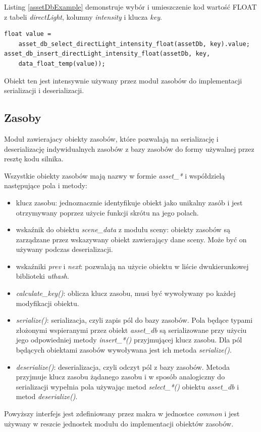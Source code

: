 Listing \ref{assetDbExample} demonstruje wybór i umieszczenie kod wartość FLOAT z tabeli \textit{directLight}, kolumny \textit{intensity} i klucza \textit{key}.
\lstset{language=C}
\begin{lstlisting}[caption={Deserializacja i serializacja wartości zmiennoprzecinkowej},captionpos=b,label={assetDbExample}]
float value =
	asset_db_select_directLight_intensity_float(assetDb, key).value;
asset_db_insert_directLight_intensity_float(assetDb, key,
	data_float_temp(value));
\end{lstlisting}

Obiekt ten jest intensywnie używany przez moduł zasobów do implementacji serializacji i deserializacji.

\subsection{Zasoby}

Moduł zawierajacy obiekty zasobów, które pozwalają na serializację i deserializację indywidualnych zasobów z bazy zasobów do formy używalnej przez resztę kodu silnika.

Wszystkie obiekty zasobów mają nazwy w formie \textit{asset\_*} i współdzielą następujące pola i metody:
\begin{itemize}
	\item klucz zasobu: jednoznacznie identyfikuje obiekt jako unikalny zasób i jest otrzymywany poprzez użycie funkcji skrótu na jego polach.
	\item wskaźnik do obiektu \textit{scene\_data} z modułu sceny: obiekty zasobów są zarządzane przez wskazywany obiekt zawierający dane sceny. Może być on używany podczas deserializacji.
	\item wskaźniki \textit{prev} i \textit{next}: pozwalają na użycie obiektu w liście dwukierunkowej biblioteki \textit{uthash}.
	\item \textit{calculate\_key()}: oblicza klucz zasobu, musi być wywoływany po każdej modyfikacji obiektu.
	\item \textit{serialize()}: serializacja, czyli zapis pól do bazy zasobów.
	Pola będące typami złożonymi wspieranymi przez obiekt \textit{asset\_db} są serializowane przy użyciu jego odpowiedniej metody \textit{insert\_*()} przyjmującej klucz zasobu.
	Dla pól będących obiektami zasobów wywoływana jest ich metoda \textit{serialize()}.
	\item \textit{deserialize()}: deserializacja, czyli odczyt pól z bazy zasobów.
	Metoda przyjmuje klucz zasobu żądanego zasobu i w sposób analogiczny do serializacji wypełnia pola używając metod \textit{select\_*()} obiektu \textit{asset\_db} i metod \textit{deserialize()}.
\end{itemize}
Powyższy interfejs jest zdefiniowany przez makra w jednostce \textit{common} i jest używany w reszcie jednostek modułu do implementacji obiektów zasobów.

